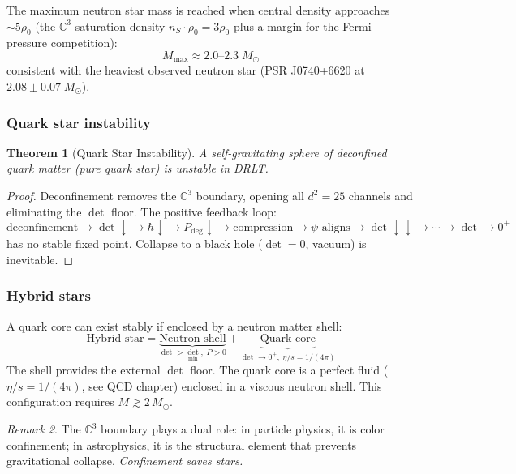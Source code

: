 \documentclass[12pt]{article}
\newtheorem{theorem}{Theorem}[section]
\theoremstyle{remark}
\newtheorem{remark}[theorem]{Remark}
\theoremstyle{definition}
\newcommand{\CC}{\mathbb{C}}
\begin{document}
The maximum neutron star mass is reached when central density approaches $\sim 5\rho_0$ (the $\CC^3$ saturation density $n_S \cdot \rho_0 = 3\rho_0$ plus a margin for the Fermi pressure competition):
\begin{equation}
M_\text{max} \approx 2.0\text{--}2.3\;M_\odot
\end{equation}
consistent with the heaviest observed neutron star (PSR J0740+6620 at $2.08 \pm 0.07\;M_\odot$).

\subsubsection{Quark star instability}

\begin{theorem}[Quark Star Instability]
A self-gravitating sphere of deconfined quark matter (pure quark star) is unstable in DRLT.
\end{theorem}

\begin{proof}
Deconfinement removes the $\CC^3$ boundary, opening all $d^2 = 25$ channels and eliminating the $\det$ floor. The positive feedback loop:
\begin{equation}
\text{deconfinement} \to \det\!\downarrow \to \hbar\!\downarrow \to P_\text{deg}\!\downarrow \to \text{compression} \to \psi\text{ aligns} \to \det\!\downarrow\!\downarrow \to \cdots \to \det \to 0^+
\end{equation}
has no stable fixed point. Collapse to a black hole ($\det = 0$, vacuum) is inevitable.
\end{proof}

\subsubsection{Hybrid stars}

A quark core can exist stably if enclosed by a neutron matter shell:
\begin{equation}
\text{Hybrid star} = \underbrace{\text{Neutron shell}}_{\det > \det_\text{min},\; P > 0} + \underbrace{\text{Quark core}}_{\det \to 0^+,\;\eta/s = 1/(4\pi)}
\end{equation}
The shell provides the external $\det$ floor. The quark core is a perfect fluid ($\eta/s = 1/(4\pi)$, see QCD chapter) enclosed in a viscous neutron shell. This configuration requires $M \gtrsim 2\,M_\odot$.

\begin{remark}
The $\CC^3$ boundary plays a dual role: in particle physics, it is color confinement; in astrophysics, it is the structural element that prevents gravitational collapse. \emph{Confinement saves stars.}
\end{remark}
\end{document}
